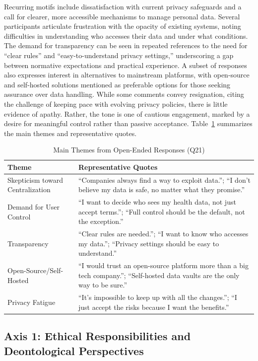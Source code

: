 		Recurring motifs include dissatisfaction with current privacy safeguards and a call for clearer, more accessible mechanisms to manage personal data. Several participants articulate frustration with the opacity of existing systems, noting difficulties in understanding who accesses their data and under what conditions. The demand for transparency can be seen in repeated references to the need for “clear rules” and “easy-to-understand privacy settings,” underscoring a gap between normative expectations and practical experience.
		A subset of responses also expresses interest in alternatives to mainstream platforms, with open-source and self-hosted solutions mentioned as preferable options for those seeking assurance over data handling. While some comments convey resignation, citing the challenge of keeping pace with evolving privacy policies, there is little evidence of apathy. Rather, the tone is one of cautious engagement, marked by a desire for meaningful control rather than passive acceptance.
		Table~\ref{tab:qualitative_themes} summarizes the main themes and representative quotes.

		\begin{table}[ht]
			\caption{Main Themes from Open-Ended Responses (Q21)}
			\centering
			\begin{tabular}{p{3.5cm}p{11cm}}
				\toprule
				\textbf{Theme} & \textbf{Representative Quotes} \\
				\midrule
				Skepticism toward Centralization & “Companies always find a way to exploit data.”; “I don’t believe my data is safe, no matter what they promise.” \\
				Demand for User Control & “I want to decide who sees my health data, not just accept terms.”; “Full control should be the default, not the exception.” \\
				Transparency & “Clear rules are needed.”; “I want to know who accesses my data.”; “Privacy settings should be easy to understand.” \\
				Open-Source/Self-Hosted & “I would trust an open-source platform more than a big tech company.”; “Self-hosted data vaults are the only way to be sure.” \\
				Privacy Fatigue & “It’s impossible to keep up with all the changes.”; “I just accept the risks because I want the benefits.” \\
				\bottomrule
			\end{tabular}
			\label{tab:qualitative_themes}
		\end{table}
\subsection{Axis 1: Ethical Responsibilities and Deontological Perspectives}
